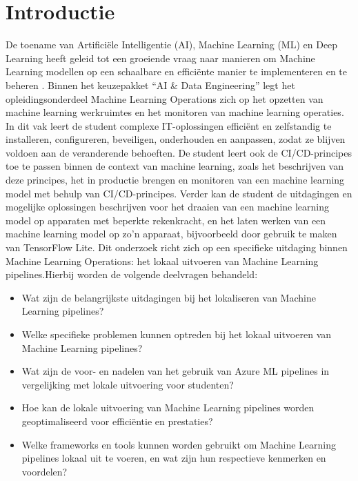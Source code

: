 
\section{Introductie}%
\label{sec:introductie}

De toename van Artificiële Intelligentie (AI), Machine Learning (ML) en Deep Learning heeft geleid tot een groeiende vraag naar manieren om Machine Learning modellen op een schaalbare en efficiënte manier te implementeren en te beheren \autocite{Aggarwal2022}.
Binnen het keuzepakket ``AI \& Data Engineering'' legt het opleidingsonderdeel Machine Learning Operations zich op het opzetten van machine learning werkruimtes en het monitoren van machine learning operaties. In dit vak leert de student complexe IT-oplossingen efficiënt en zelfstandig te installeren, configureren, beveiligen, onderhouden en aanpassen, zodat ze blijven voldoen aan de veranderende behoeften. De student leert ook de CI/CD-principes toe te passen binnen de context van machine learning, zoals het beschrijven van deze principes, het in productie brengen en monitoren van een machine learning model met behulp van CI/CD-principes. Verder kan de student de uitdagingen en mogelijke oplossingen beschrijven voor het draaien van een machine learning model op apparaten met beperkte rekenkracht, en het laten werken van een machine learning model op zo'n apparaat, bijvoorbeeld door gebruik te maken van TensorFlow Lite.
Dit onderzoek richt zich op een specifieke uitdaging binnen Machine Learning Operations: het lokaal uitvoeren van Machine Learning pipelines.Hierbij worden de volgende deelvragen behandeld:
\begin{itemize}
  \item Wat zijn de belangrijkste uitdagingen bij het lokaliseren van Machine Learning pipelines?
  \item Welke specifieke problemen kunnen optreden bij het lokaal uitvoeren van Machine Learning pipelines?
  \item Wat zijn de voor- en nadelen van het gebruik van Azure ML pipelines in vergelijking met lokale uitvoering voor studenten?
  \item Hoe kan de lokale uitvoering van Machine Learning pipelines worden geoptimaliseerd voor efficiëntie en prestaties?
  \item Welke frameworks en tools kunnen worden gebruikt om Machine Learning pipelines lokaal uit te voeren, en wat zijn hun respectieve kenmerken en voordelen?
\end{itemize}

